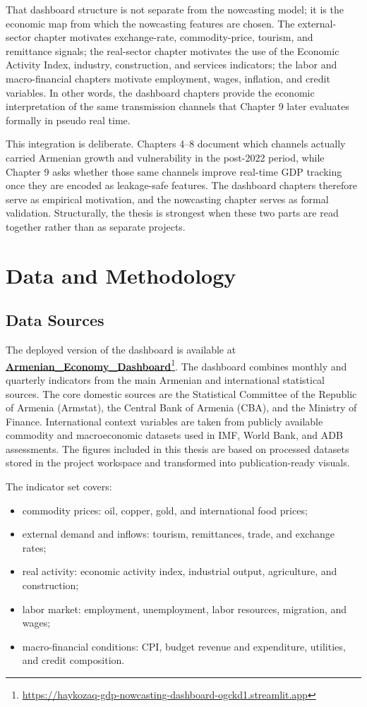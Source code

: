 \documentclass[12pt,a4paper]{report}
\begin{document}
That dashboard structure is not separate from the nowcasting model; it is the economic map from which the nowcasting features are chosen. The external-sector chapter motivates exchange-rate, commodity-price, tourism, and remittance signals; the real-sector chapter motivates the use of the Economic Activity Index, industry, construction, and services indicators; the labor and macro-financial chapters motivate employment, wages, inflation, and credit variables. In other words, the dashboard chapters provide the economic interpretation of the same transmission channels that Chapter 9 later evaluates formally in pseudo real time.

This integration is deliberate. Chapters 4--8 document which channels actually carried Armenian growth and vulnerability in the post-2022 period, while Chapter 9 asks whether those same channels improve real-time GDP tracking once they are encoded as leakage-safe features. The dashboard chapters therefore serve as empirical motivation, and the nowcasting chapter serves as formal validation. Structurally, the thesis is strongest when these two parts are read together rather than as separate projects.

\chapter{Data and Methodology}
\section{Data Sources}
The deployed version of the dashboard is available at \href{https://haykozaq-gdp-nowcasting-dashboard-ogckd1.streamlit.app/}{\textbf{Armenian\_Economy\_Dashboard}}\footnote{\url{https://haykozaq-gdp-nowcasting-dashboard-ogckd1.streamlit.app}}. The dashboard combines monthly and quarterly indicators from the main Armenian and international statistical sources. The core domestic sources are the Statistical Committee of the Republic of Armenia (Armstat), the Central Bank of Armenia (CBA), and the Ministry of Finance. International context variables are taken from publicly available commodity and macroeconomic datasets used in IMF, World Bank, and ADB assessments. The figures included in this thesis are based on processed datasets stored in the project workspace and transformed into publication-ready visuals.\cite{armstatbank,cbaMPR2025Q1,minfinBudget,imfCR24348,wbMEU2025,adbADO2024}

The indicator set covers:
\begin{itemize}
    \item commodity prices: oil, copper, gold, and international food prices;
    \item external demand and inflows: tourism, remittances, trade, and exchange rates;
    \item real activity: economic activity index, industrial output, agriculture, and construction;
    \item labor market: employment, unemployment, labor resources, migration, and wages;
    \item macro-financial conditions: CPI, budget revenue and expenditure, utilities, and credit composition.
\end{itemize}
\end{document}
